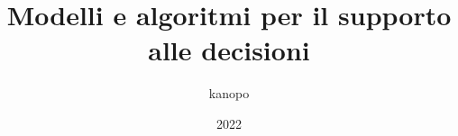 \documentclass{article}
\begin{document}
    \author{kanopo}
    \title{Modelli e algoritmi per il supporto alle decisioni}
    \date{2022}

    \maketitle
    \tableofcontents

    \listoffigures
    \listoftables


    
    
    

    
\end{document}
